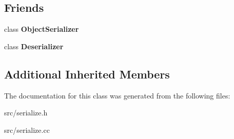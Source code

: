 \subsection*{Friends}
\begin{DoxyCompactItemize}
\item 
\hypertarget{classv8_1_1internal_1_1_serializer_a075eec39eaa96c886c847f9364a847c4}{}class {\bfseries Object\+Serializer}\label{classv8_1_1internal_1_1_serializer_a075eec39eaa96c886c847f9364a847c4}

\item 
\hypertarget{classv8_1_1internal_1_1_serializer_a0c541e43f0cc8d5a52e519ebcf1709f5}{}class {\bfseries Deserializer}\label{classv8_1_1internal_1_1_serializer_a0c541e43f0cc8d5a52e519ebcf1709f5}

\end{DoxyCompactItemize}
\subsection*{Additional Inherited Members}


The documentation for this class was generated from the following files\+:\begin{DoxyCompactItemize}
\item 
src/serialize.\+h\item 
src/serialize.\+cc\end{DoxyCompactItemize}
